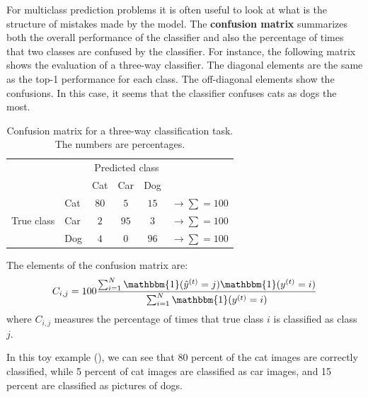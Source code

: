 For multiclass prediction problems it is often useful to look at what is the structure of mistakes made by the model. The {\bf confusion matrix}
summarizes both the overall performance of the classifier and also the percentage of times that two classes are confused by the classifier. For instance, the following matrix shows the evaluation of a three-way classifier. The diagonal elements are the same as the top-1 performance for each class. The off-diagonal elements show the confusions. In this case, it seems that the classifier confuses cats as dogs the most. 
\begin{table}[h]
\caption{Confusion matrix for a three-way classification task. The numbers are percentages. } 
\label{table:confusion_matrix}
\begin{center}
\begin{tabular}{l|l|c|c|c|c}
\multicolumn{2}{c}{}&\multicolumn{3}{c}{Predicted class}&\\
\cline{3-5}
\multicolumn{2}{c|}{}&Cat&Car&Dog&\multicolumn{1}{c}{}\\
\cline{2-5}
& Cat & $80$ & $5$ & $15$ & $\rightarrow \sum = 100$\\
\cline{2-5}
True class & Car & $2$ & $95$ & $3$ & $\rightarrow \sum = 100$\\
\cline{2-5}
& Dog & $4$ & $0$ & $96$ & $\rightarrow \sum = 100$\\
\cline{2-5}
\end{tabular}
\end{center}
\end{table}
The elements of the confusion matrix are:
\begin{equation}
    C_{i,j} = 100 \frac{
    \sum_{i=1}^N \mathbbm{1}( \hat{y}^{(t)} = j)  \mathbbm{1} (y^{(t)} = i)
    }{
    \sum_{i=1}^N \mathbbm{1}(y^{(t)} = i) 
    }
\end{equation}
where $C_{i,j}$ measures the percentage of times that true class $i$ is classified as class $j$. 

In this toy example (\tab{\ref{table:confusion_matrix}}), we can see that 80 percent of the cat images are correctly classified, while 5 percent of cat images are classified as car images, and 15 percent are classified as pictures of dogs.



